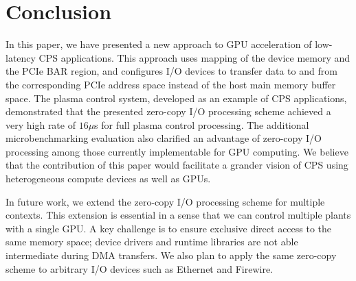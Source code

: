 \section{Conclusion}
\label{sec:conclusion}

In this paper, we have presented a new approach to GPU acceleration of
low-latency CPS applications.
This approach uses mapping of the device memory and the PCIe BAR
region, and configures I/O devices to transfer data to and from the
corresponding PCIe address space instead of the host main memory buffer
space.
The plasma control system, developed as an example of CPS applications,
demonstrated that the presented zero-copy I/O processing scheme achieved
a very high rate of $16\mu$s for full plasma control processing.
The additional microbenchmarking evaluation also clarified an advantage
of zero-copy I/O processing among those currently implementable for GPU
computing. 
We believe that the contribution of this paper would facilitate a
grander vision of CPS using heterogeneous compute devices as well as
GPUs.

In future work, we extend the zero-copy I/O processing scheme for
multiple contexts.
This extension is essential in a sense that we can control multiple
plants with a single GPU.
A key challenge is to ensure exclusive direct access to the same memory
space; device drivers and runtime libraries are not able intermediate
during DMA transfers.
We also plan to apply the same zero-copy scheme to arbitrary I/O devices
such as Ethernet and Firewire.